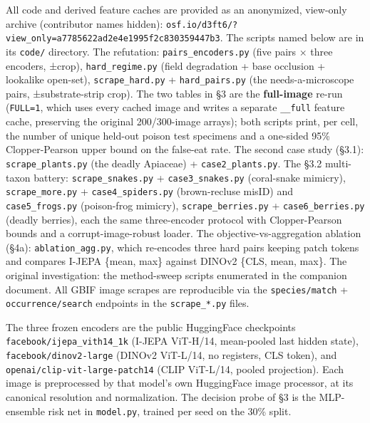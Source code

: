 All code and derived feature caches are provided as an anonymized,
view-only archive (contributor names hidden):
\texttt{osf.io/d3ft6/?view\_only=a7785622ad2e4e1995f2c830359447b3}. The
scripts named below are in its \texttt{code/} directory. The refutation:
\texttt{pairs\_encoders.py} (five pairs × three encoders, ±crop),
\texttt{hard\_regime.py} (field degradation + base occlusion + lookalike
open-set), \texttt{scrape\_hard.py} + \texttt{hard\_pairs.py} (the
needs-a-microscope pairs, ±substrate-strip crop). The two tables in §3
are the \textbf{full-image} re-run (\texttt{FULL=1}, which uses every
cached image and writes a separate \texttt{\_\_full} feature cache,
preserving the original 200/300-image arrays); both scripts print, per
cell, the number of unique held-out poison test specimens and a
one-sided 95\% Clopper-Pearson upper bound on the false-eat rate. The
second case study (§3.1): \texttt{scrape\_plants.py} (the deadly
Apiaceae) + \texttt{case2\_plants.py}. The §3.2 multi-taxon battery:
\texttt{scrape\_snakes.py} + \texttt{case3\_snakes.py} (coral-snake
mimicry), \texttt{scrape\_more.py} + \texttt{case4\_spiders.py}
(brown-recluse misID) and \texttt{case5\_frogs.py} (poison-frog
mimicry), \texttt{scrape\_berries.py} + \texttt{case6\_berries.py}
(deadly berries), each the same three-encoder protocol with
Clopper-Pearson bounds and a corrupt-image-robust loader. The
objective-vs-aggregation ablation (§4a): \texttt{ablation\_agg.py},
which re-encodes three hard pairs keeping patch tokens and compares
I-JEPA \{mean, max\} against DINOv2 \{CLS, mean, max\}. The original
investigation: the method-sweep scripts enumerated in the companion
document. All GBIF image scrapes are reproducible via the
\texttt{species/match} + \texttt{occurrence/search} endpoints in the
\texttt{scrape\_*.py} files.

The three frozen encoders are the public HuggingFace checkpoints
\texttt{facebook/ijepa\_vith14\_1k} (I-JEPA ViT-H/14, mean-pooled last
hidden state), \texttt{facebook/dinov2-large} (DINOv2 ViT-L/14, no
registers, CLS token), and \texttt{openai/clip-vit-large-patch14} (CLIP
ViT-L/14, pooled projection). Each image is preprocessed by that model's
own HuggingFace image processor, at its canonical resolution and
normalization. The decision probe of §3 is the MLP-ensemble risk net in
\texttt{model.py}, trained per seed on the 30\% split.

